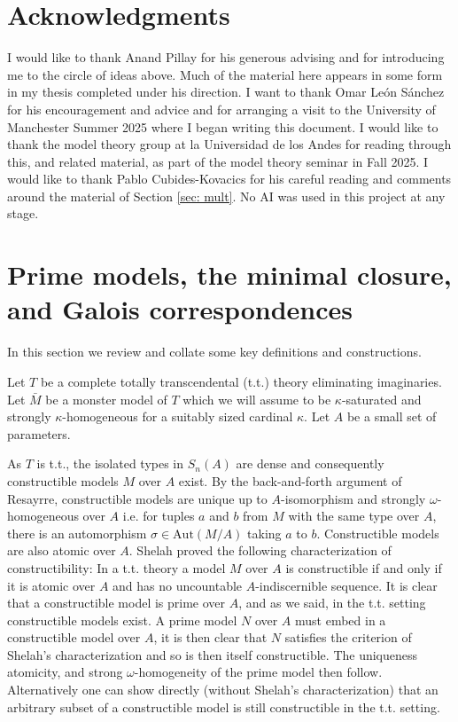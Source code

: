 \documentclass{amsart}
\theoremstyle{definition}
\theoremstyle{remark}
\numberwithin{equation}{section}
\def \aut {\text{Aut}}
\begin{document}


\section{Acknowledgments} 

I would like to thank Anand Pillay for his generous advising and for introducing me to the circle of ideas above. Much of the material here appears in some form in my thesis completed under his direction. I want to thank Omar León Sánchez for his encouragement and advice and for arranging a visit to the University of Manchester Summer 2025 where I began writing this document. I would like to thank the model theory group at la Universidad de los Andes for reading through this, and related material, as part of the model theory seminar in Fall 2025. I would like to thank Pablo Cubides-Kovacics for his careful reading and comments around the material of Section \ref{sec: mult}. No AI was used in this project at any stage.


\section{Prime models, the minimal closure, and Galois correspondences}\label{sec: min}

In this section we review and collate some key definitions and constructions. 

Let $T$ be a complete totally transcendental (t.t.) theory eliminating imaginaries. Let $\bar{M}$ be a monster model of $T$ which we will assume to be $\kappa$-saturated and strongly $\kappa$-homogeneous for a suitably sized cardinal $\kappa$. Let $A$ be a small set of parameters.

As $T$ is t.t., the isolated types in $S_n(A)$ are dense and consequently constructible models $M$ over $A$ exist. By the back-and-forth argument of Resayrre, constructible models are unique up to $A$-isomorphism and strongly $\omega$-homogeneous over $A$ i.e. for tuples $a$ and $b$ from $M$ with the same type over $A$, there is an automorphism $\sigma \in \aut(M/A)$ taking $a$ to $b$. Constructible models are also atomic over $A$. Shelah proved the following characterization of constructibility:  In a t.t. theory a model $M$ over $A$ is constructible if and only if it is atomic over $A$ and has no uncountable $A$-indiscernible sequence. It is clear that a constructible model is prime over $A$, and as we said, in the t.t. setting constructible models exist. A prime model $N$ over $A$ must embed in a constructible model over $A$, it is then clear that $N$ satisfies the criterion of Shelah's characterization and so is then itself constructible. The uniqueness atomicity, and strong $\omega$-homogeneity of the prime model then follow. Alternatively one can show directly (without Shelah's characterization) that an arbitrary subset of a constructible model is still constructible in the t.t. setting.
\end{document}

